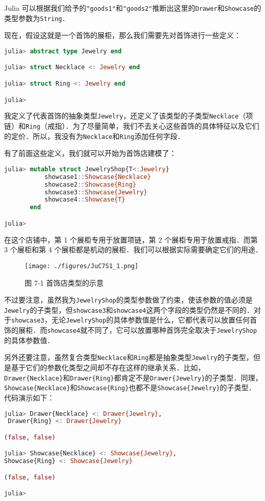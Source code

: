 Julia 可以根据我们给予的\verb|"goods1"|和\verb|"goods2"|推断出这里的\verb|Drawer|和\verb|Showcase|的类型参数为\verb|String|．

现在，假设这就是一个首饰的展柜，那么我们需要先对首饰进行一些定义：
\begin{lstlisting}[language=julia]
julia> abstract type Jewelry end

julia> struct Necklace <: Jewelry end

julia> struct Ring <: Jewelry end

julia> 
\end{lstlisting}

我定义了代表首饰的抽象类型\verb|Jewelry|，还定义了该类型的子类型\verb|Necklace|（项链）和\verb|Ring|（戒指）．为了尽量简单，我们不去关心这些首饰的具体特征以及它们的定价．所以，我没有为\verb|Necklace|和\verb|Ring|添加任何字段．

有了前面这些定义，我们就可以开始为首饰店建模了：
\begin{lstlisting}[language=julia]
julia> mutable struct JewelryShop{T<:Jewelry}
           showcase1::Showcase{Necklace}
           showcase2::Showcase{Ring}
           showcase3::Showcase{Jewelry}
           showcase4::Showcase{T}
       end

julia> 
\end{lstlisting}

在这个店铺中，第 1 个展柜专用于放置项链，第 2 个展柜专用于放置戒指．而第 3 个展柜和第 4 个展柜都是机动的展柜．我们可以根据实际需要确定它们的用途．
\begin{figure}[ht]
\centering
\texttt{[image: ./figures/JuC7S1\_1.png]}
\caption{图 7-1 首饰店类型的示意} \label{JuC7S1_fig1}
\end{figure}

不过要注意，虽然我为\verb|JewelryShop|的类型参数做了约束，使该参数的值必须是\verb|Jewelry|的子类型，但\verb|showcase3|和\verb|showcase4|这两个字段的类型仍然是不同的．对于\verb|showcase3|，无论\verb|JewelryShop|的具体参数值是什么，它都代表可以放置任何首饰的展柜．而\verb|showcase4|就不同了，它可以放置哪种首饰完全取决于\verb|JewelryShop|的具体参数值．

另外还要注意，虽然复合类型\verb|Necklace|和\verb|Ring|都是抽象类型\verb|Jewelry|的子类型，但是基于它们的参数化类型之间却不存在这样的继承关系．比如，\verb|Drawer{Necklace}|和\verb|Drawer{Ring}|都肯定不是\verb|Drawer{Jewelry}|的子类型．同理，\verb|Showcase{Necklace}|和\verb|Showcase{Ring}|也都不是\verb|Showcase{Jewelry}|的子类型．代码演示如下：
\begin{lstlisting}[language=julia]
julia> Drawer{Necklace} <: Drawer{Jewelry},
 Drawer{Ring} <: Drawer{Jewelry}

(false, false)

julia> Showcase{Necklace} <: Showcase{Jewelry}, 
Showcase{Ring} <: Showcase{Jewelry}

(false, false)

julia> 
\end{lstlisting}

